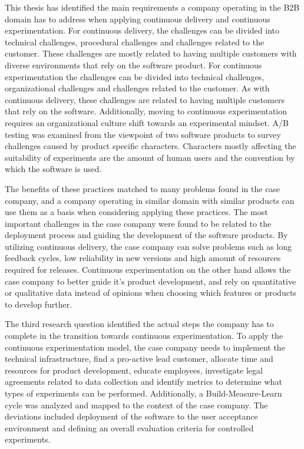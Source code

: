 \documentclass[english]{tktltiki2}
\theoremstyle{definition}
\theoremstyle{remark}
\begin{document}
This thesis has identified the main requirements a company operating in the B2B domain has to address when applying continuous delivery and continuous experimentation. For continuous delivery, the challenges can be divided into technical challenges, procedural challenges and challenges related to the customer. These challenges are mostly related to having multiple customers with diverse environments that rely on the software product. For continuous experimentation the challenges can be divided into technical challenges, organizational challenges and challenges related to the customer. As with continuous delivery, these challenges are related to having multiple customers that rely on the software. Additionally, moving to continuous experimentation requires an organizational culture shift towards an experimental mindset. A/B testing was examined from the viewpoint of two software products to survey challenges caused by product specific characters. Characters mostly affecting the suitability of experiments are the amount of human users and the convention by which the software is used.

The benefits of these practices matched to many problems found in the case company, and a company operating in similar domain with similar products can use them as a basis when considering applying these practices. The most important challenges in the case company were found to be related to the deployment process and guiding the development of the software products. By utilizing continuous delivery, the case company can solve problems such as long feedback cycles, low reliability in new versions and high amount of resources required for releases. Continuous experimentation on the other hand allows the case company to better guide it's product development, and rely on quantitative or qualitative data instead of opinions when choosing which features or products to develop further.

The third research question identified the actual steps the company has to complete in the transition towards continuous experimentation. To apply the continuous experimentation model, the case company needs to implement the technical infrastructure, find a pro-active lead customer, allocate time and resources for product development, educate employees, investigate legal agreements related to data collection and identify metrics to determine what types of experiments can be performed. Additionally, a Build-Measure-Learn cycle \cite{fagerholm2014building} was analyzed and mapped to the context of the case company. The deviations included deployment of the software to the user acceptance environment and defining an overall evaluation criteria for controlled experiments. 
\end{document}

